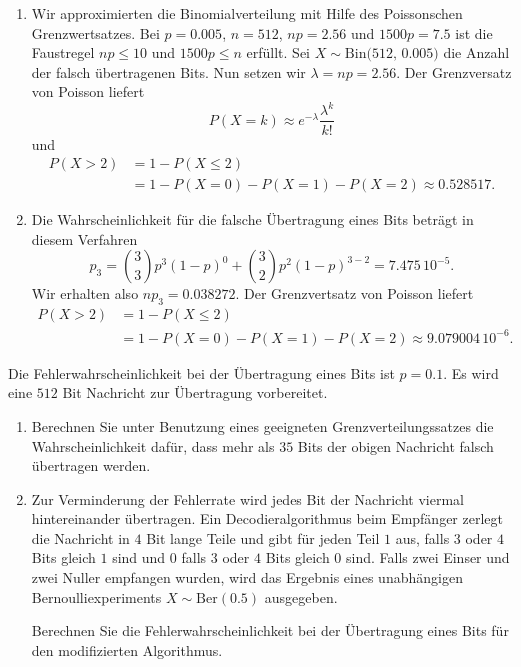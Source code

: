 \solution
\begin{enumerate}
    \item Wir approximierten die Binomialverteilung mit Hilfe des Poissonschen
        Grenzwertsatzes. Bei $p=0.005$, $n=512$, $np=2.56$ und $1500p = 7.5$
        ist die Faustregel $np \leq 10$ und $1500p\leq n$ erfüllt. Sei $X\sim
        \text{Bin(512, 0.005)}$ die Anzahl der falsch übertragenen Bits. Nun
        setzen wir $\lambda = np = 2.56$. Der Grenzversatz von Poisson liefert
        \begin{equation*}
            P(X=k) \approx e^{-\lambda } \frac{\lambda^{k}}{k!}
        \end{equation*}
        und
        \begin{align*}
            P\left( X>2 \right) &= 1 - P(X \leq 2) \\
            &= 1 - P(X=0)-P(X=1)-P(X=2) \approx 0.528517.
        \end{align*}
    \item Die Wahrscheinlichkeit für die falsche Übertragung eines Bits beträgt
        in diesem Verfahren
        \begin{equation*}
            p_3 = \binom{3}{3} p^{3}\left( 1-p \right)^{0} + \binom{3}{2} p^{2} \left( 1-p \right)^{3-2} = 7.475\, 10^{-5}.
        \end{equation*}
        Wir erhalten also $n p_3 = 0.038272$. Der Grenzvertsatz von Poisson liefert
        \begin{align*}
            P\left( X>2 \right) &= 1 - P(X \leq 2) \\
            &= 1 - P(X=0)-P(X=1)-P(X=2) \approx 9.079004\, 10^{-6}.
        \end{align*}
\end{enumerate}

 Die Fehlerwahrscheinlichkeit
bei der Übertragung eines Bits ist $p=0.1$. Es wird eine $512$ Bit Nachricht zur Übertragung
vorbereitet.
\begin{enumerate}
    \item Berechnen Sie unter Benutzung eines geeigneten Grenzverteilungssatzes
        die Wahrscheinlichkeit dafür, dass mehr als $35$ Bits der obigen
        Nachricht falsch übertragen werden.

    \item Zur Verminderung der Fehlerrate wird jedes Bit der Nachricht viermal
        hintereinander übertragen. Ein Decodieralgorithmus beim Empfänger zerlegt
        die Nachricht in $4$ Bit lange Teile und gibt für jeden Teil $1$ aus,
        falls $3$ oder $4$ Bits gleich $1$ sind und $0$ falls $3$ oder $4$ Bits
        gleich $0$ sind. Falls zwei Einser und zwei Nuller empfangen wurden,
        wird das Ergebnis eines unabhängigen Bernoulliexperiments $X\sim
        \text{Ber}(0.5)$ ausgegeben. 
        
        Berechnen Sie die Fehlerwahrscheinlichkeit bei der Übertragung eines
        Bits für den modifizierten Algorithmus. 
\end{enumerate}

